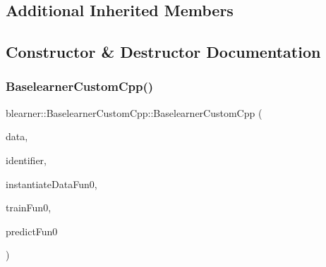 \subsection*{Additional Inherited Members}


\subsection{Constructor \& Destructor Documentation}
\mbox{\label{classblearner_1_1_baselearner_custom_cpp_a7714c44164d0f763a861217ff2d53480}} 
\subsubsection{\texorpdfstring{Baselearner\+Custom\+Cpp()}{BaselearnerCustomCpp()}}
{\footnotesize\ttfamily blearner\+::\+Baselearner\+Custom\+Cpp\+::\+Baselearner\+Custom\+Cpp (\begin{DoxyParamCaption}\item[{\mbox{\hyperlink{classdata_1_1_data}{data\+::\+Data}} $\ast$}]{data,  }\item[{const std\+::string \&}]{identifier,  }\item[{S\+E\+XP}]{instantiate\+Data\+Fun0,  }\item[{S\+E\+XP}]{train\+Fun0,  }\item[{S\+E\+XP}]{predict\+Fun0 }\end{DoxyParamCaption})}

